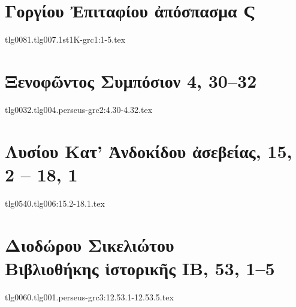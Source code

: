 \documentclass[a4paper,12pt,twoside]{report}
\begin{document}
\chapter[Γοργίου Ἐπιτάφιος]{\textgreek[variant=ancient]{Γοργίου Ἐπιταφίου ἀπόσπασμα Ϛ}}
\label{chap:gorgias}%

{tlg0081.tlg007.1st1K-grc1:1-5.tex}


\chapter[Ξενοφῶντος Συμπόσιον]{\textgreek[variant=ancient]{Ξενοφῶντος Συμπόσιον} 4, 30–32}

{tlg0032.tlg004.perseus-grc2:4.30-4.32.tex}


\chapter[Λυσίου Κατ' Ἀνδοκίδου ἀσεβείας]{\textgreek[variant=ancient]{Λυσίου Κατ' Ἀνδοκίδου ἀσεβείας,} 15, 2 – 18, 1}

{tlg0540.tlg006:15.2-18.1.tex}



\chapter[Διοδώρου Βιβλιοθήκης ἱστορικής ΙΒ]{\textgreek[variant=ancient]{Διοδώρου Σικελιώτου \\Βιβλιοθήκης ἱστορικῆς ΙΒ,} 53, 1–5}

{tlg0060.tlg001.perseus-grc3:12.53.1-12.53.5.tex}
%
\end{document}
